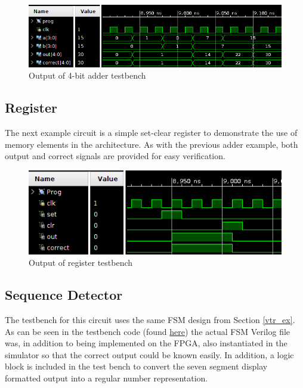 \documentclass[12pt]{article}
\begin{document}
\begin{figure}[H]
    \centering
    \includegraphics[width=1\textwidth]{adder}
    \caption{Output of 4-bit adder testbench}
    \label{fig:adder}
\end{figure}

\subsection{Register}

The next example circuit is a simple set-clear register to demonstrate the use of
memory elements in the architecture. As with the previous adder example, both output
and correct signals are provided for easy verification.

\begin{figure}[H]
    \centering
    \includegraphics[width=1\textwidth]{sr_reg}
    \caption{Output of register testbench}
    \label{fig:sr_reg}
\end{figure}

\subsection{Sequence Detector} \label{sec:sec_dec}

The testbench for this circuit uses the same FSM design from Section \ref{vtr_ex}.
As can be seen in the testbench code (found
\href{https://github.com/JosephPrachar/fpga/blob/master/tb/fpgavs2_tb.v}{here}) the actual FSM Verilog
file was, in addition to being implemented on the FPGA, also
instantiated in the simulator so that the correct output could be known easily. In addition,
a logic block is included in the test bench to convert the seven segment
display formatted output into a regular number representation.
\end{document}
